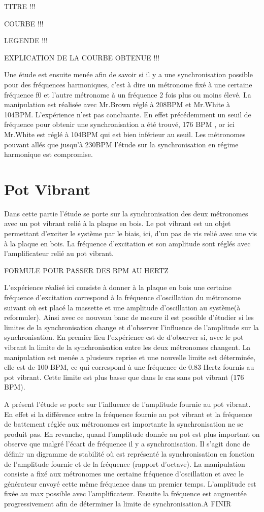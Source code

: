 \documentclass[a4paper,11pt]{report}
\begin{document}
					TITRE !!!
					
					COURBE !!!
					
					LEGENDE !!!
					
					EXPLICATION DE LA COURBE OBTENUE !!!
					
Une étude est ensuite menée afin de savoir si il y a une synchronisation possible pour des fréquences harmoniques, c'est à dire un métronome fixé à une certaine fréquence f0 et l'autre métronome à un fréquence 2 fois plus ou moins élevé. La manipulation est réalisée avec Mr.Brown réglé à 208BPM et Mr.White à 104BPM. L'expérience n'est pas concluante. En effet précédemment un seuil de fréquence pour obtenir une synchronisation a été trouvé, 176 BPM , or ici Mr.White est réglé à 104BPM qui est bien inférieur au seuil. Les métronomes pouvant allés que jusqu'à 230BPM l'étude sur la synchronisation en régime harmonique est compromise. 

\section{Pot Vibrant}
Dans cette partie l'étude se porte sur la synchronisation des deux métronomes avec un pot vibrant relié à la plaque en bois. Le pot vibrant est un objet permettant d'exciter le système par le biais, ici, d'un pas de vis relié avec une vis à la plaque en bois. La fréquence d'excitation et son amplitude sont réglés avec l'amplificateur relié au pot vibrant.

												FORMULE POUR PASSER DES BPM AU HERTZ

 L'expérience réalisé ici consiste à donner à la plaque en bois une certaine fréquence d'excitation correspond à la fréquence d'oscillation du métronome suivant où est placé la massette et une amplitude d'oscillation au système(à reformuler).
Ainsi avec ce nouveau banc de mesure il est possible d'étudier si les limites de la synchronisation change et d'observer l'influence de l'amplitude sur la synchronisation. En premier lieu l'expérience est de d'observer si, avec le pot vibrant la limite de la synchronisation entre les deux métronomes changent. La manipulation est menée a plusieurs reprise et une nouvelle limite est déterminée, elle est de 100 BPM, ce qui correspond à une fréquence de 0.83 Hertz fournis au pot vibrant. Cette limite est plus basse que dans le cas sans pot vibrant (176 BPM).

	A présent l'étude se porte sur l'influence de l'amplitude fournie au pot vibrant. En effet si la différence entre la fréquence fournie au pot vibrant et la fréquence de battement réglée aux métronomes est importante la synchronisation ne se produit pas. En revanche, quand l'amplitude donnée au pot est plus important on observe que malgré l'écart de fréquence il y a synchronisation. Il s'agit donc de définir un digramme de stabilité où est représenté la synchronisation en fonction de l'amplitude fournie et de la fréquence (rapport d'octave). La manipulation consiste a fixé aux métronomes une certaine fréquence d'oscillation et avec le générateur envoyé cette même fréquence dans un premier temps. L'amplitude est fixée au max possible avec l'amplificateur. Ensuite la fréquence est augmentée progressivement afin de déterminer la limite de synchronisation.A FINIR
	  
\end{document}
